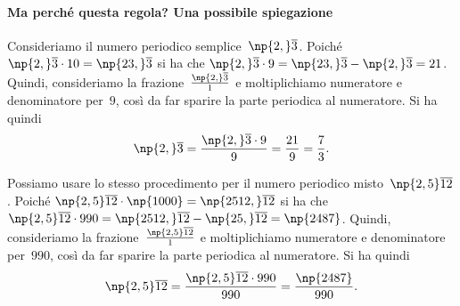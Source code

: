 \paragraph*{Ma perché questa regola? Una possibile spiegazione}
Consideriamo il numero periodico semplice~$\np{2,}\overline{3}$.
Poiché $\np{2,}\overline{3} \cdot 10 = \np{23,}\overline{3}$ si ha che $\np{2,}\overline{3} \cdot 9 = \np{23,}\overline{3} - \np{2,}\overline{3} = 21$.
Quindi, consideriamo la frazione~$\frac{\np{2,}\overline{3}}{1}$ e moltiplichiamo numeratore e denominatore per~$9$, così da far sparire
la parte periodica al numeratore. Si ha quindi
\[\np{2,}\overline{3}=\frac{\np{2,}\overline{3}\cdot 9}{9}=\frac{21}{9}=\frac{7}{3}.\]

%
%

Possiamo usare lo stesso procedimento per il numero periodico misto~$\np{2,5}\overline{12}$.
Poiché $\np{2,5}\overline{12} \cdot \np{1000} = \np{2512,}\overline{12}$ si ha che $\np{2,5}\overline{12} \cdot 990 = \np{2512,}\overline{12} - \np{25,}\overline{12} = \np{2487}$.
Quindi, consideriamo la frazione~$\frac{\np{2,5}\overline{12}}{1}$ e moltiplichiamo numeratore e denominatore per~$990$, così da far sparire
la parte periodica al numeratore. Si ha quindi
\[\np{2,5}\overline{12}=\frac{\np{2,5}\overline{12} \cdot 990}{990}=\frac{\np{2487}}{990}.\]


